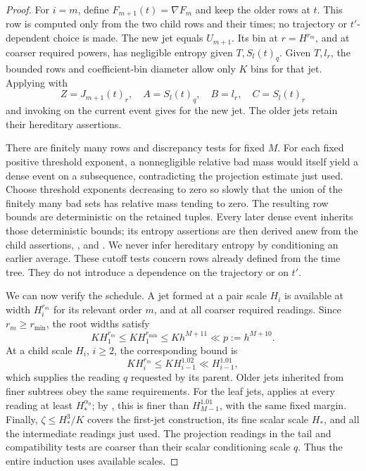 \begin{proof}
For \(i=m\), define \(F_{m+1}(t)=\nabla F_m\) and keep the older rows
at \(t\).  This row is computed only from the two child rows and their
times; no trajectory or \(t'\)-dependent choice is made.
The new jet equals \(U_{m+1}\).
Its bin at \(r=H^{r_m}\), and at coarser required powers, has negligible
entropy given \(T,S_l(t)_q\).
Given \(T,l_r\), the bounded rows and coefficient-bin diameter allow
only \(K\) bins for that jet.
Applying  with
\[
 Z=J_{m+1}(t)_r,\quad A=S_l(t)_q,\quad B=l_r,\quad C=S_l(t)_r
\]
and invoking  on the current event gives
 for the new jet.
The older jets retain their hereditary assertions.

There are finitely many rows and discrepancy tests for fixed \(M\).
For each fixed positive threshold exponent, a nonnegligible relative
bad mass would itself yield a dense event on a subsequence, contradicting
the projection estimate just used.
Choose threshold exponents decreasing to zero so slowly that the
union of the finitely many bad sets has relative mass tending to zero.
The resulting row bounds are deterministic on the retained tuples.
Every later dense event inherits those deterministic bounds; its
entropy assertions are then derived anew from the child assertions,
, and
.
We never infer hereditary entropy by conditioning an earlier average.
These cutoff tests concern rows already defined from the time tree.
They do not introduce a dependence on the trajectory or on \(t'\).

We can now verify the schedule.  A jet formed at a pair scale \(H_i\)
is available at width \(H_i^{r_m}\) for its relevant order \(m\), and
at all coarser required readings.  Since \(r_m\ge r_{\min}\), the
root widths satisfy
\[
 KH_1^{r_m}\le KH_1^{r_{\min}}\le Kh^{M+11}
          \ll p:=h^{M+10}.
\]
At a child scale \(H_i\), \(i\ge2\), the corresponding bound is
\[
 KH_i^{r_m}\le KH_{i-1}^{1.02}\ll H_{i-1}^{1.01},
\]
which supplies the reading \(q\) requested by its parent.  Older jets
inherited from finer subtrees obey the same requirements.  For the
leaf jets,  applies at every reading at
least \(H_*^{\alpha_0}\); by , this is
finer than \(H_{M-1}^{1.01}\), with the same fixed margin.
Finally, \(\zeta\le H_*^3/K\) covers the first-jet construction, its
fine scalar scale \(H_*\), and all the intermediate readings just
used.  The projection readings in the tail and compatibility tests
are coarser than their scalar conditioning scale \(q\).
Thus the entire induction uses available scales.


\end{proof}

